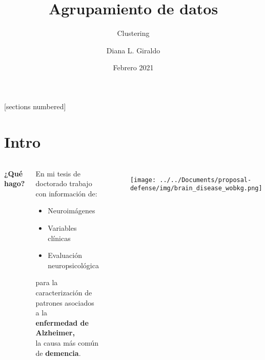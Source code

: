 \documentclass[10pt, aspectratio=169]{beamer}
\title{\textcolor{UltraViolet} {\huge Agrupamiento de datos}}
\subtitle{Clustering}
\date{Febrero 2021}
\author{Diana L. Giraldo}
\begin{document}
\maketitle

\begin{frame}{}
  [sections numbered]
  \tableofcontents[hideallsubsections]
\end{frame}


\section{Intro}

{
\begin{frame}[fragile]{}
\vspace{0.4cm}
\begin{columns}
\alert{\textbf{\Large{¿Qué hago?}}}\\
\vspace{0.4cm}
\begin{center}
 En mi tesis de doctorado trabajo con información de:
\begin{itemize}
 \item Neuroimágenes
 \item Variables clínicas
 \item Evaluación neuropsicológica
\end{itemize}
para la caracterización de patrones asociados a la\\
\vspace{0.3cm}
\textcolor{BlueMoon}{\textbf{\Large enfermedad de Alzheimer,}}\\
\vspace{0.1cm}
la causa más común de \textbf{demencia}.
\end{center}
\begin{figure}
\texttt{[image: ../../Documents/proposal-defense/img/brain\_disease\_wobkg.png]}
\end{figure}
\end{columns} 
\end{frame}
}
\end{document}
